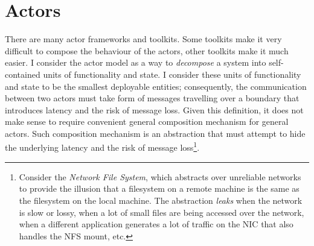 \section{Actors}
There are many actor frameworks and toolkits\cite{akka,scalaz8,transient,thespian}. Some toolkits make it very difficult to compose the behaviour of the actors\cite{akka,thespian}, other toolkits make it much easier\cite{scalaz8,transient}. I consider the actor model as a way to \emph{decompose} a system into self-contained units of functionality and state. I consider these units of functionality and state to be the smallest deployable entities; consequently, the communication between two actors must take form of messages travelling over a boundary that introduces latency and the risk of message loss. Given this definition, it does not make sense to require convenient general composition mechanism for general actors. Such composition mechanism is an abstraction that must attempt to hide the underlying latency and the risk of message loss\footnote{Consider the \emph{Network File System}, which abstracts over unreliable networks to provide the illusion that a filesystem on a remote machine is the same as the filesystem on the local machine. The abstraction \emph{leaks} when the network is slow or lossy, when a lot of small files are being accessed over the network, when a different application generates a lot of traffic on the NIC that also handles the NFS mount, etc.}. 


\printbibliography

